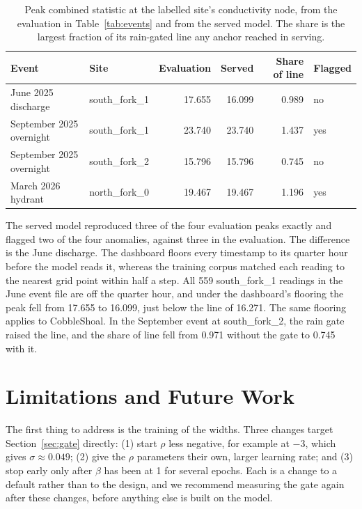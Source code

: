 \documentclass{article}
\begin{document}
\begin{table}[t]
  \centering
  \caption{Peak combined statistic at the labelled site's conductivity node,
    from the evaluation in Table~\ref{tab:events} and from the served model.
    The share is the largest fraction of its rain-gated line any anchor
    reached in serving.}
  \label{tab:served}
  \begin{tabular}{llrrrl}
    \toprule
    Event & Site & Evaluation & Served & Share of line & Flagged \\
    \midrule
    June 2025 discharge      & south\_fork\_1 & 17.655 & 16.099 & 0.989 & no \\
    September 2025 overnight & south\_fork\_1 & 23.740 & 23.740 & 1.437 & yes \\
    September 2025 overnight & south\_fork\_2 & 15.796 & 15.796 & 0.745 & no \\
    March 2026 hydrant       & north\_fork\_0 & 19.467 & 19.467 & 1.196 & yes \\
    \bottomrule
  \end{tabular}
\end{table}

The served model reproduced three of the four evaluation peaks exactly and
flagged two of the four anomalies, against three in the evaluation. The
difference is the June discharge. The dashboard floors every timestamp to its
quarter hour before the model reads it, whereas the training corpus matched
each reading to the nearest grid point within half a step. All 559
south\_fork\_1 readings in the June event file are off the quarter hour, and
under the dashboard's flooring the peak fell from 17.655 to 16.099, just below
the line of 16.271. The same flooring applies to CobbleShoal. In the
September event at south\_fork\_2, the rain gate raised the line, and the
share of line fell from 0.971 without the gate to 0.745 with it.

\section{Limitations and Future Work}
\label{sec:limitations}

The first thing to address is the training of the widths. Three changes target
Section~\ref{sec:gate} directly: (1) start $\rho$ less negative, for example at
$-3$, which gives $\sigma \approx 0.049$; (2) give the $\rho$ parameters their
own, larger learning rate; and (3) stop early only after $\beta$ has been at 1
for several epochs. Each is a change to a default rather than to the design,
and we recommend measuring the gate again after these changes, before anything
else is built on the model.
\end{document}
